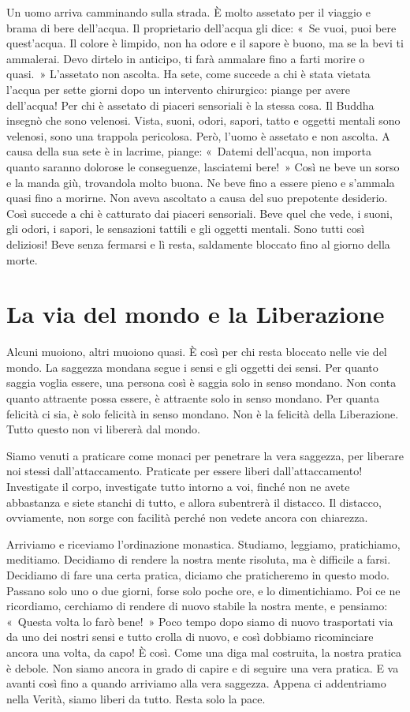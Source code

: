 Un uomo arriva camminando sulla strada. È molto assetato per il viaggio
e brama di bere dell'acqua. Il proprietario dell'acqua gli dice: «~Se
vuoi, puoi bere quest'acqua. Il colore è limpido, non ha odore e il
sapore è buono, ma se la bevi ti ammalerai. Devo dirtelo in anticipo, ti
farà ammalare fino a farti morire o quasi.~» L'assetato non ascolta. Ha
sete, come succede a chi è stata vietata l'acqua per sette giorni dopo
un intervento chirurgico: piange per avere dell'acqua! Per chi è
assetato di piaceri sensoriali è la stessa cosa. Il Buddha insegnò che
sono velenosi. Vista, suoni, odori, sapori, tatto e oggetti mentali sono
velenosi, sono una trappola pericolosa. Però, l'uomo è assetato e non
ascolta. A causa della sua sete è in lacrime, piange: «~Datemi
dell'acqua, non importa quanto saranno dolorose le conseguenze,
lasciatemi bere!~» Così ne beve un sorso e la manda giù, trovandola
molto buona. Ne beve fino a essere pieno e s'ammala quasi fino a
morirne. Non aveva ascoltato a causa del suo prepotente desiderio. Così
succede a chi è catturato dai piaceri sensoriali. Beve quel che vede, i
suoni, gli odori, i sapori, le sensazioni tattili e gli oggetti mentali.
Sono tutti così deliziosi! Beve senza fermarsi e lì resta, saldamente
bloccato fino al giorno della morte.

\section{La via del mondo e la Liberazione}

Alcuni muoiono, altri muoiono quasi. È così per chi resta bloccato nelle
vie del mondo. La saggezza mondana segue i sensi e gli oggetti dei
sensi. Per quanto saggia voglia essere, una persona così è saggia solo
in senso mondano. Non conta quanto attraente possa essere, è attraente
solo in senso mondano. Per quanta felicità ci sia, è solo felicità in
senso mondano. Non è la felicità della Liberazione. Tutto questo non vi
libererà dal mondo.

Siamo venuti a praticare come monaci per penetrare la vera saggezza, per
liberare noi stessi dall'attaccamento. Praticate per essere liberi
dall'attaccamento! Investigate il corpo, investigate tutto intorno a
voi, finché non ne avete abbastanza e siete stanchi di tutto, e allora
subentrerà il distacco. Il distacco, ovviamente, non sorge con facilità
perché non vedete ancora con chiarezza.

Arriviamo e riceviamo l'ordinazione monastica. Studiamo, leggiamo,
pratichiamo, meditiamo. Decidiamo di rendere la nostra mente risoluta,
ma è difficile a farsi. Decidiamo di fare una certa pratica, diciamo che
praticheremo in questo modo. Passano solo uno o due giorni, forse solo
poche ore, e lo dimentichiamo. Poi ce ne ricordiamo, cerchiamo di
rendere di nuovo stabile la nostra mente, e pensiamo: «~Questa volta lo
farò bene!~» Poco tempo dopo siamo di nuovo trasportati via da uno dei
nostri sensi e tutto crolla di nuovo, e così dobbiamo ricominciare
ancora una volta, da capo! È così. Come una diga mal costruita, la
nostra pratica è debole. Non siamo ancora in grado di capire e di
seguire una vera pratica. E va avanti così fino a quando arriviamo alla
vera saggezza. Appena ci addentriamo nella Verità, siamo liberi da
tutto. Resta solo la pace.

